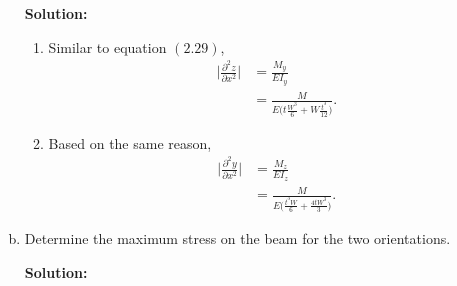 \documentclass[12pt]{article}
\begin{document}
\begin{enumerate}[(a)]
	      \textbf{Solution:}
	      \begin{enumerate}[(b1)]
		      \item Similar to equation $(2.29)$,
		            \begin{equation}
			            \begin{split}
				            \bigg| \frac{ \partial^2 z }{ \partial  x^2} \bigg| &= \frac{ M_y }{ E I_y }\\
				            &= \frac{ M }{ E  \big( t \frac{ W^3 }{ 6 } + W \frac{ t^3 }{ 12 } \big)}.
			            \end{split}
		            \end{equation}
		      \item Based on the same reason,
		            \begin{equation}
			            \begin{split}
				            \bigg| \frac{ \partial^2 y }{ \partial x^2 } \bigg| &= \frac{ M_z }{ E I_z } \\
				            &= \frac{ M }{ E \big( \frac{t^3 W}{6} + \frac{4 t W^3}{3} \big)}.
			            \end{split}
		            \end{equation}
	      \end{enumerate}
	\item Determine the maximum stress on the beam for the two orientations.

	      \textbf{Solution:}


\end{enumerate}
\end{document}
